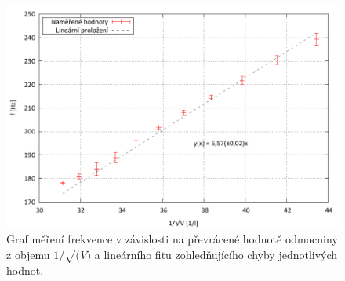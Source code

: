 \documentclass[english]{article}
\begin{document}
	\begin{figure}[p]
	\begin{center}
	    \vspace*{-1cm}
	    \includegraphics[width=\linewidth]{../gnuplot/9_aku_helm_out.pdf}
	    \vspace*{-1cm}    
		\caption{Graf měření frekvence v závislosti na převrácené hodnotě odmocniny z objemu $1/\sqrt(V)$ a lineárního fitu zohledňujícího chyby jednotlivých hodnot.}
		\label{fig:g_helm}
	\end{center}
	\end{figure}

\end{document}
